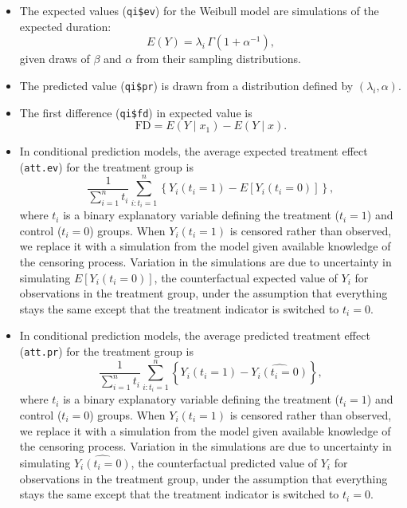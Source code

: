 \begin{itemize}
\item The expected values ({\tt qi\$ev}) for the Weibull model are
  simulations of the expected duration:
\begin{equation*}
E(Y) = \lambda_i \, \Gamma (1 + \alpha^{-1}),
\end{equation*}
given draws of $\beta$ and $\alpha$ from their sampling
distributions. 

\item The predicted value ({\tt qi\$pr}) is drawn from a distribution
  defined by $(\lambda_i, \alpha)$.  

\item The first difference ({\tt qi\$fd}) in expected value is
\begin{equation*}
\textrm{FD} = E(Y \mid x_1) - E(Y \mid x). 
\end{equation*}

\item In conditional prediction models, the average expected treatment
  effect ({\tt att.ev}) for the treatment group is 
    \begin{equation*} \frac{1}{\sum_{i=1}^n t_i}\sum_{i:t_i=1}^n \left\{ Y_i(t_i=1) -
      E[Y_i(t_i=0)] \right\},
    \end{equation*} 
    where $t_i$ is a binary explanatory variable defining the
    treatment ($t_i=1$) and control ($t_i=0$) groups. When
    $Y_i(t_i=1)$ is censored rather than observed, we replace it with
    a simulation from the model given available knowledge of the
    censoring process.  Variation in the simulations are due to
    uncertainty in simulating $E[Y_i(t_i=0)]$, the counterfactual
    expected value of $Y_i$ for observations in the treatment group,
    under the assumption that everything stays the same except that
    the treatment indicator is switched to $t_i=0$.

\item In conditional prediction models, the average predicted treatment
  effect ({\tt att.pr}) for the treatment group is 
    \begin{equation*} \frac{1}{\sum_{i=1}^n t_i}\sum_{i:t_i=1}^n \left\{ Y_i(t_i=1) -
      \widehat{Y_i(t_i=0)} \right\},
    \end{equation*} 
    where $t_i$ is a binary explanatory variable defining the
    treatment ($t_i=1$) and control ($t_i=0$) groups.  When
    $Y_i(t_i=1)$ is censored rather than observed, we replace it with
    a simulation from the model given available knowledge of the
    censoring process.  Variation in the simulations are due to
    uncertainty in simulating $\widehat{Y_i(t_i=0)}$, the
    counterfactual predicted value of $Y_i$ for observations in the
    treatment group, under the assumption that everything stays the
    same except that the treatment indicator is switched to $t_i=0$.
\end{itemize}


